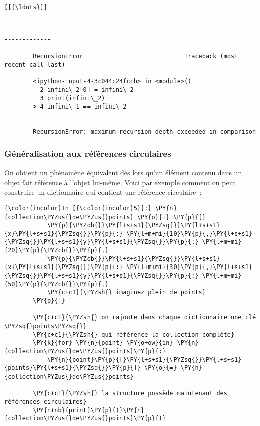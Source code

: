     \begin{Verbatim}[commandchars=\\\{\}]
[[{\ldots}]]

    \end{Verbatim}

    \begin{Verbatim}[commandchars=\\\{\}]

        ---------------------------------------------------------------------------

        RecursionError                            Traceback (most recent call last)

        <ipython-input-4-3c044c24fccb> in <module>()
          2 infini\_2[0] = infini\_2
          3 print(infini\_2)
    ----> 4 infini\_1 == infini\_2
    

        RecursionError: maximum recursion depth exceeded in comparison

    \end{Verbatim}

    \hypertarget{guxe9nuxe9ralisation-aux-ruxe9fuxe9rences-circulaires}{%
\subsubsection{Généralisation aux références
circulaires}\label{guxe9nuxe9ralisation-aux-ruxe9fuxe9rences-circulaires}}

    On obtient un phénomène équivalent dès lors qu'un élément contenu dans
un objet fait référence à l'objet lui-même. Voici par exemple comment on
peut construire un dictionnaire qui contient une référence circulaire~:

    \begin{Verbatim}[commandchars=\\\{\}]
{\color{incolor}In [{\color{incolor}5}]:} \PY{n}{collection\PYZus{}de\PYZus{}points} \PY{o}{=} \PY{p}{[}
            \PY{p}{\PYZob{}}\PY{l+s+s1}{\PYZsq{}}\PY{l+s+s1}{x}\PY{l+s+s1}{\PYZsq{}}\PY{p}{:} \PY{l+m+mi}{10}\PY{p}{,}\PY{l+s+s1}{\PYZsq{}}\PY{l+s+s1}{y}\PY{l+s+s1}{\PYZsq{}}\PY{p}{:} \PY{l+m+mi}{20}\PY{p}{\PYZcb{}}\PY{p}{,}
            \PY{p}{\PYZob{}}\PY{l+s+s1}{\PYZsq{}}\PY{l+s+s1}{x}\PY{l+s+s1}{\PYZsq{}}\PY{p}{:} \PY{l+m+mi}{30}\PY{p}{,}\PY{l+s+s1}{\PYZsq{}}\PY{l+s+s1}{y}\PY{l+s+s1}{\PYZsq{}}\PY{p}{:} \PY{l+m+mi}{50}\PY{p}{\PYZcb{}}\PY{p}{,}
            \PY{c+c1}{\PYZsh{} imaginez plein de points}
        \PY{p}{]}
        
        \PY{c+c1}{\PYZsh{} on rajoute dans chaque dictionnaire une clé \PYZsq{}points\PYZsq{}}
        \PY{c+c1}{\PYZsh{} qui référence la collection complète}
        \PY{k}{for} \PY{n}{point} \PY{o+ow}{in} \PY{n}{collection\PYZus{}de\PYZus{}points}\PY{p}{:}
            \PY{n}{point}\PY{p}{[}\PY{l+s+s1}{\PYZsq{}}\PY{l+s+s1}{points}\PY{l+s+s1}{\PYZsq{}}\PY{p}{]} \PY{o}{=} \PY{n}{collection\PYZus{}de\PYZus{}points}
        
        \PY{c+c1}{\PYZsh{} la structure possède maintenant des références circulaires}
        \PY{n+nb}{print}\PY{p}{(}\PY{n}{collection\PYZus{}de\PYZus{}points}\PY{p}{)}
\end{Verbatim}


